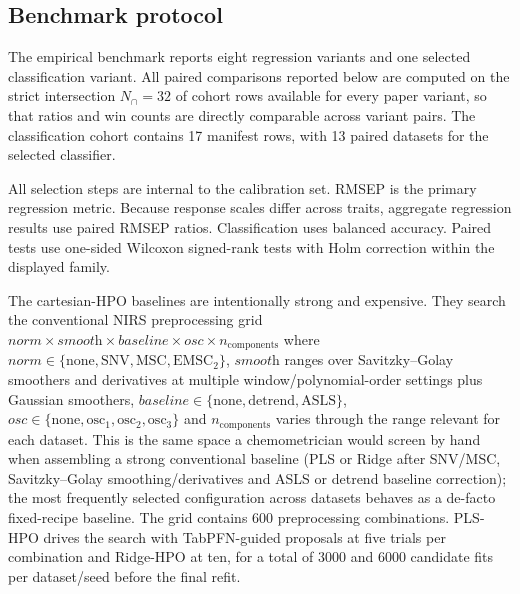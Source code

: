 \documentclass[11pt,a4paper]{article}
\begin{document}
\subsection{Benchmark protocol}

The empirical benchmark reports eight regression variants and one selected
classification variant.  All paired comparisons reported below are computed
on the strict intersection $N_{\cap}=32$ of cohort rows available for every
paper variant, so that ratios and win counts are directly comparable across
variant pairs.  The classification cohort contains 17 manifest rows, with 13
paired datasets for the selected classifier.

\begin{table}[t]
  \centering
  \caption{Cohort denominators and data-quality rules used in the main
  manuscript.}
  \label{tab:benchmark_diversity}
  \small
  
\end{table}

All selection steps are internal to the calibration set.  RMSEP is the primary
regression metric.  Because response scales differ across traits, aggregate
regression results use paired RMSEP ratios.  Classification uses balanced
accuracy.  Paired tests use one-sided Wilcoxon signed-rank tests with Holm
correction within the displayed family.

The cartesian-HPO baselines are intentionally strong and expensive.  They
search the conventional NIRS preprocessing grid
$\textit{norm}\times\textit{smooth}\times\textit{baseline}\times\textit{osc}\times n_{\mathrm{components}}$
where
$\textit{norm}\in\{\text{none},\text{SNV},\text{MSC},\text{EMSC}_{2}\}$,
$\textit{smooth}$ ranges over Savitzky--Golay smoothers and derivatives at
multiple window/polynomial-order settings plus Gaussian smoothers,
$\textit{baseline}\in\{\text{none},\text{detrend},\text{ASLS}\}$,
$\textit{osc}\in\{\text{none},\text{osc}_1,\text{osc}_2,\text{osc}_3\}$ and
$n_{\mathrm{components}}$ varies through the range relevant for each dataset.
This is the same space a chemometrician would screen by hand when assembling a
strong conventional baseline (PLS or Ridge after SNV/MSC, Savitzky--Golay
smoothing/derivatives and ASLS or detrend baseline correction); the most
frequently selected configuration across datasets behaves as a de-facto
fixed-recipe baseline.  The grid contains 600 preprocessing combinations.
PLS-HPO drives the search with TabPFN-guided proposals at five trials per
combination and Ridge-HPO at ten, for a total of 3000 and 6000 candidate fits
per dataset/seed before the final refit.
\end{document}
